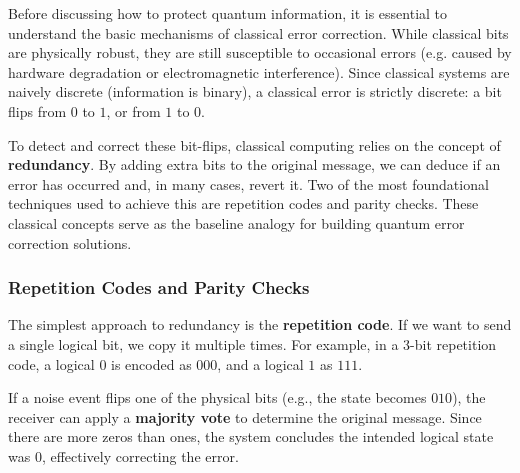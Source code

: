 Before discussing how to protect quantum information, it is essential to understand the basic mechanisms of classical error correction. While classical bits are physically robust, they are still susceptible to occasional errors (e.g. caused by hardware degradation or electromagnetic interference). Since classical systems are naively discrete (information is binary), a classical error is strictly discrete: a bit flips from $0$ to $1$, or from $1$ to $0$.

To detect and correct these bit-flips, classical computing relies on the concept of \textbf{redundancy}. By adding extra bits to the original message, we can deduce if an error has occurred and, in many cases, revert it. Two of the most foundational techniques used to achieve this are repetition codes and parity checks. These classical concepts serve as the baseline analogy for building quantum error correction solutions.

\subsubsection*{Repetition Codes and Parity Checks}

The simplest approach to redundancy is the \textbf{repetition code}. If we want to send a single logical bit, we copy it multiple times. For example, in a 3-bit repetition code, a logical $0$ is encoded as $000$, and a logical $1$ as $111$. 

If a noise event flips one of the physical bits (e.g., the state becomes $010$), the receiver can apply a \textbf{majority vote} to determine the original message. Since there are more zeros than ones, the system concludes the intended logical state was $0$, effectively correcting the error.

